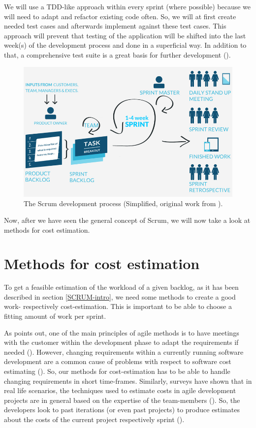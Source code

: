 We will use a \ac{TDD}-like approach within every sprint (where possible) because we will need to adapt and refactor existing code often. So, we will at first create needed test cases and afterwards implement against these test cases. This approach will prevent that testing of the application will be shifted into the last week(s) of the development process and done in a superficial way. In addition to that, a comprehensive test suite is a great basis for further development (\cite{max03}).

\begin{figure}[th]
\centerline{\includegraphics[width=1\textwidth]{gfx/scrum}}
\caption{The Scrum development process (Simplified, original work from \cite{5_maxxor.com_2015}).}
\label{ScrumDia}
\end{figure}

Now, after we have seen the general concept of Scrum, we will now take a look at methods for cost estimation. 

\section{Methods for cost estimation}
\label{cost}
To get a feasible estimation of the workload of a given backlog, as it has been described in section \ref{SCRUM-intro}, we need some methods to create a good work- respectively cost-estimation. This is important to be able to choose a fitting amount of work per sprint.

As \cite{Keaveney11} points out, one of the main principles of agile methods is to have meetings with the customer within the development phase to adapt the requirements if needed (\cite{beck2001agile}). However, changing requirements within a currently running software development are a common cause of problems with respect to software cost estimating (\cite{jones2003flawed}). So, our methods for cost-estimation has to be able to handle changing requirements in short time-frames. Similarly, surveys have shown that in real life scenarios, the techniques used to estimate costs in agile development projects are in general based on the expertise of the team-members (\cite{ceschi2005project}). So, the developers look to past iterations (or even past projects) to produce estimates about the costs of the current project respectively sprint (\cite{ceschi2005project}). 

